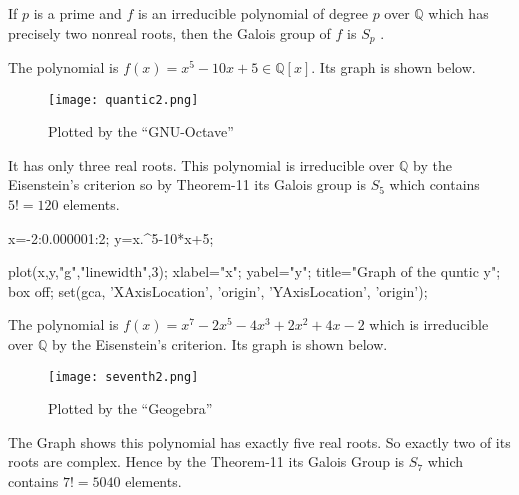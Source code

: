 \begin{theorem}
If \(p\) is a prime and \(f\) is an irreducible polynomial of degree \(p\) over \(\mathbb{Q}\) which has precisely two nonreal roots, then the Galois group of \(f\) is \(S_p\) \cite{hunger}.
\end{theorem}

\begin{example}
  The polynomial is \(f(x)=x^5-10x+5 \in \mathbb{Q}[x]\). Its graph is shown below.
  \begin{figure}[h!]
    \texttt{[image: quantic2.png]}
    \caption{\footnotesize Plotted by the ``GNU-Octave''}
  \end{figure}

  It has only three real roots. This polynomial is irreducible over \(\mathbb{Q}\) by the Eisenstein's criterion so by Theorem-11 its Galois group is \(S_5\) which contains \(5!=120\) elements.
 \end{example}

  \begin{tcolorbox}[colback=gray!20, colframe=blue!30, title={\small \bfseries \textcolor{black}{GNU-Octave Code for the above plotting}}, width=15cm]
\begin{boxedverbatim}
  x=-2:0.000001:2;
  y=x.^5-10*x+5;

  plot(x,y,"g","linewidth",3);
  xlabel="x";                     yabel="y";
  title="Graph of the quntic y";
  box off;
  set(gca, 'XAxisLocation', 'origin', 'YAxisLocation', 'origin');
\end{boxedverbatim}
  \end{tcolorbox}

\vspace{5mm}

\begin{example}
  The polynomial is \(f(x)=x^7-2x^5-4x^3+2x^2+4x-2\) which is irreducible over \(\mathbb{Q}\) by the Eisenstein's criterion. Its graph is shown below.

    \begin{figure}[h!]
    \texttt{[image: seventh2.png]}
    \caption{\footnotesize Plotted by the ``Geogebra''}
  \end{figure}
The Graph shows this polynomial has exactly five real roots. So exactly two of its roots are complex. Hence by the Theorem-11 its Galois Group is \(S_7\) which contains \(7!=5040\) elements.
\end{example}

\vspace{5mm}
